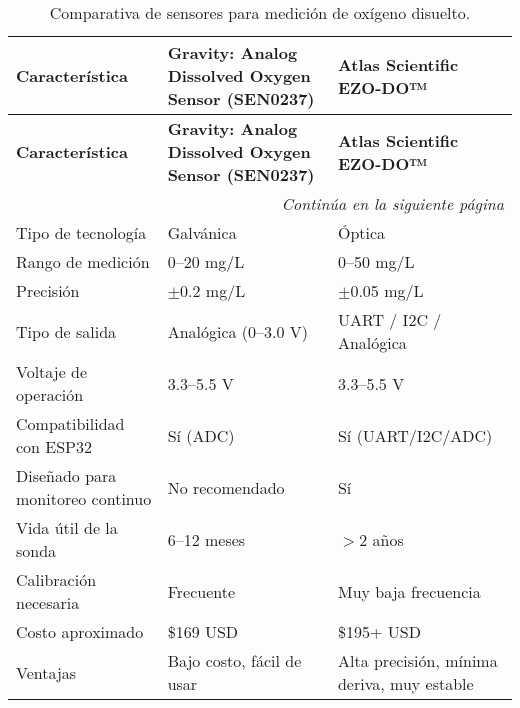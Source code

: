 \renewcommand{\arraystretch}{1.5}
\begin{longtable}{
    |p{4cm}
    |p{5cm}
    |p{5cm}|
}
\caption{Comparativa de sensores para medición de oxígeno disuelto.}
\label{tab:sensores_od} \\
\hline
\textbf{Característica} 
    & \textbf{Gravity: Analog Dissolved Oxygen Sensor (SEN0237) \cite{DFRobot_DO_Sensor}} 
    & \textbf{Atlas Scientific EZO-DO™ \cite{Atlas_DO_Sensor_Manual}} \\
\hline
\endfirsthead

\hline
\textbf{Característica} 
    & \textbf{Gravity: Analog Dissolved Oxygen Sensor (SEN0237) \cite{DFRobot_DO_Sensor}} 
    & \textbf{Atlas Scientific EZO-DO™ \cite{Atlas_DO_Sensor_Manual}} \\
\hline
\endhead

\hline
\multicolumn{3}{r}{\textit{Continúa en la siguiente página}} \\
\endfoot

\hline
\endlastfoot

Tipo de tecnología 
    & Galvánica 
    & Óptica \\ \hline

Rango de medición 
    & 0--20 mg/L 
    & 0--50 mg/L \\ \hline

Precisión 
    & $\pm$0.2 mg/L 
    & $\pm$0.05 mg/L \\ \hline

Tipo de salida 
    & Analógica (0--3.0 V) 
    & UART / I2C / Analógica \\ \hline

Voltaje de operación 
    & 3.3--5.5 V 
    & 3.3--5.5 V \\ \hline

Compatibilidad con ESP32 
    & Sí (ADC) 
    & Sí (UART/I2C/ADC) \\ \hline

Diseñado para monitoreo continuo 
    & No recomendado 
    & Sí \\ \hline

Vida útil de la sonda 
    & 6--12 meses 
    & $>$2 años \\ \hline

Calibración necesaria 
    & Frecuente 
    & Muy baja frecuencia \\ \hline

Costo aproximado 
    & \$169 USD 
    & \$195+ USD \\ \hline

Ventajas 
    & Bajo costo, fácil de usar 
    & Alta precisión, mínima deriva, muy estable \\ \hline


\end{longtable}
